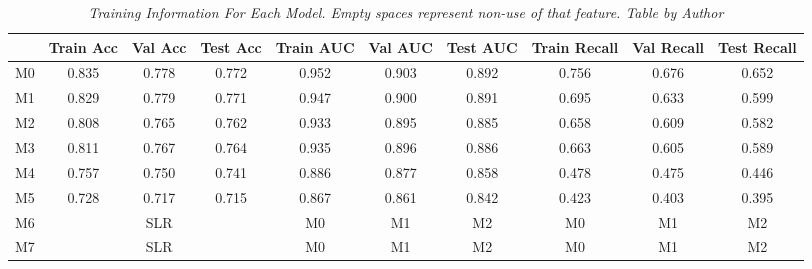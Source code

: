 \begin{landscape}

\begin{table}
\centering
\begin{tabular}{lccccccccc}
    \toprule
 & Train Acc & Val Acc & Test Acc & Train AUC & Val AUC &  Test AUC & Train Recall & Val Recall &  Test Recall \\
 \midrule
M0 & 0.835 & 0.778 & 0.772 & 0.952 & 0.903 & 0.892 & 0.756 & 0.676 & 0.652 \\
M1 & 0.829 & 0.779 & 0.771 & 0.947 & 0.900 & 0.891 & 0.695 & 0.633 & 0.599 \\
M2 & 0.808 & 0.765 & 0.762 & 0.933 & 0.895 & 0.885 & 0.658 & 0.609 & 0.582 \\
M3 & 0.811 & 0.767 & 0.764 & 0.935 & 0.896 & 0.886 & 0.663 & 0.605 & 0.589 \\
\cellcolor{gray!50}M4 & \cellcolor{gray!50}0.757 & \cellcolor{gray!50}0.750 & \cellcolor{gray!50}0.741 &  \cellcolor{gray!50}0.886 & \cellcolor{gray!50}0.877 & \cellcolor{gray!50}0.858 & \cellcolor{gray!50}0.478 & \cellcolor{gray!50}0.475 & \cellcolor{gray!50}0.446  \\
\cellcolor{gray!50}M5 & \cellcolor{gray!50}0.728 & \cellcolor{gray!50}0.717 &  \cellcolor{gray!50}0.715 & \cellcolor{gray!50}0.867 & \cellcolor{gray!50}0.861 & \cellcolor{gray!50}0.842 & \cellcolor{gray!50}0.423 & \cellcolor{gray!50}0.403 & \cellcolor{gray!50}0.395  \\
\cellcolor{gray!50}M6 & \cellcolor{gray!50} & \cellcolor{gray!50}SLR &  \cellcolor{gray!50} & \cellcolor{gray!50}M0 & \cellcolor{gray!50}M1 & \cellcolor{gray!50}M2 & \cellcolor{gray!50}M0 & \cellcolor{gray!50}M1 & \cellcolor{gray!50}M2  \\
\cellcolor{gray!50}M7 & \cellcolor{gray!50} & \cellcolor{gray!50}SLR &  \cellcolor{gray!50} & \cellcolor{gray!50}M0 & \cellcolor{gray!50}M1 & \cellcolor{gray!50}M2 & \cellcolor{gray!50}M0 & \cellcolor{gray!50}M1 & \cellcolor{gray!50}M2  \\
\bottomrule
\end{tabular}
\caption[Training Information For Each Model.]
  {\textit{Training Information For Each Model. Empty spaces represent non-use of that feature.
  Table by Author}}
{\label{table:resume-metrics}}
\end{table}

\end{landscape}
